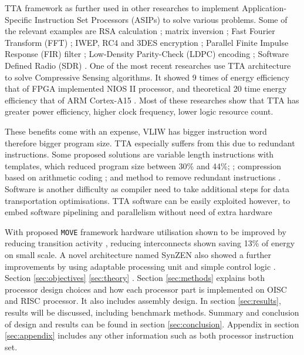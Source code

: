 TTA framework as further used in other researches to implement Application-Specific Instruction Set Processors (ASIPs) to solve various problems. Some of the relevant examples are RSA calculation \autocite{6128530}; matrix inversion \autocite{1540373}; Fast Fourier Transform (FFT) \autocite{8682289}; IWEP, RC4 and 3DES encryption \autocite{922340}; Parallel Finite Impulse Response (FIR) filter \autocite{1511285}; Low-Density Parity-Check (LDPC) encoding \autocite{6855236}; Software Defined Radio (SDR) \autocite{7363689}. One of the most recent researches use TTA architecture to solve Compressive Sensing algorithms. It showed 9 times of energy efficiency that of FPGA implemented NIOS II processor, and theoretical 20 time energy efficiency that of ARM Cortex-A15 \autocite{8573494}. Most of these researches show that TTA has greater power efficiency, higher clock frequency, lower logic resource count. 

These benefits come with an expense, VLIW has bigger instruction word therefore bigger program size. TTA especially suffers from this due to redundant instructions. Some proposed solutions are variable length instructions with templates, which reduced program size between 30\% and 44\%; \autocite{1213033,6893206}; compression based on arithmetic coding \autocite{4627144}; and method to remove redundant instructions \autocite{5403730}. 
Software is another difficulty as compiler need to take additional steps for data transportation optimisations. TTA software can be easily exploited however, to embed software pipelining and parallelism without need of extra hardware\autocite{4595596}

With proposed \texttt{MOVE} framework hardware utilisation shown to be improved by reducing transition activity \autocite{1207041}, reducing interconnects shown saving 13\% of energy \autocite{6972455} on small scale. A novel architecture named SynZEN also showed a further improvements by using adaptable processing unit and simple control logic \autocite{6403142}.
\\[1cm]

Section \ref{sec:objectives} \ref{sec:theory} . Section \ref{sec:methods} explains both processor design choices and how each processor part is implemented on OISC and RISC processor. It also includes assembly design. In section \ref{sec:results}, results will be discussed, including benchmark methods. Summary and conclusion of design and results can be found in section \ref{sec:conclusion}. Appendix in section \ref{sec:appendix} includes any other information such as both processor instruction set.
